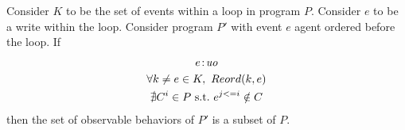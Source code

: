 \begin{corollary}
    \label{LoopInvCodeMotWrite1}
    Consider $K$ to be the set of events within a loop in program $P$. 
    Consider $e$ to be a write within the loop. 
    Consider program $P'$ with event $e$ agent ordered before the loop. 
    If
    \begin{gather}
        e\!:\!\textit{uo} \label{licmw1:eq1}\\
        \forall k \neq e \in K, \ Reord(k, e) \label{licmw1:eq2} \\ 
        \nexists C^i \in P \ \text{s.t.} \ e^{j<=i} \notin C  \label{licmw1:eq3}                    
    \end{gather}
    then the set of observable behaviors of $P'$ is a subset of $P$.

\end{corollary}             

